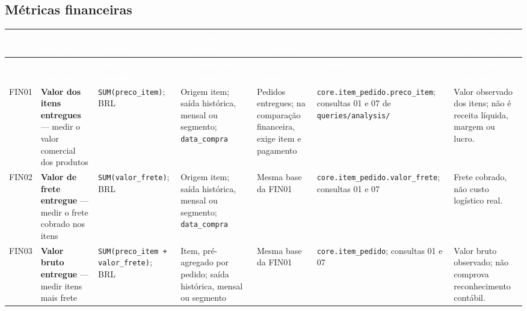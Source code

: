 \documentclass[12pt,a4paper]{article}
\newcounter{none}
\newcommand{\CabecalhoTabela}[1]{\textcolor{white}{\textbf{#1}}}
\begin{document}
\begin{landscape}
\subsection{Métricas
financeiras}\label{docs__analytics__catalogo_metricas_analiticas.md__muxe9tricas-financeiras}
{\def\LTcaptype{none}
\setlength{\tabcolsep}{2pt}
\scriptsize
{}
\begin{longtable}{|>{\RaggedRight\arraybackslash}p{1.1cm}|>{\RaggedRight\arraybackslash}p{4.0cm}|>{\RaggedRight\arraybackslash}p{3.7cm}|>{\RaggedRight\arraybackslash}p{3.5cm}|>{\RaggedRight\arraybackslash}p{3.4cm}|>{\RaggedRight\arraybackslash}p{4.0cm}|>{\RaggedRight\arraybackslash}p{3.8cm}|}
\hline
\rowcolor{AzulCorporativo}
\CabecalhoTabela{ID} & \CabecalhoTabela{Nome e finalidade} &
\CabecalhoTabela{Fórmula e unidade} &
\CabecalhoTabela{Granularidade e tempo} &
\CabecalhoTabela{Filtros e exclusões} &
\CabecalhoTabela{Fontes e SQL} &
\CabecalhoTabela{Interpretação e limitações} \\ \hline
\endfirsthead
\hline
\rowcolor{AzulCorporativo}
\CabecalhoTabela{ID} & \CabecalhoTabela{Nome e finalidade} &
\CabecalhoTabela{Fórmula e unidade} &
\CabecalhoTabela{Granularidade e tempo} &
\CabecalhoTabela{Filtros e exclusões} &
\CabecalhoTabela{Fontes e SQL} &
\CabecalhoTabela{Interpretação e limitações} \\ \hline
\endhead
\hline
\endfoot
FIN01 & \textbf{Valor dos itens entregues} --- medir o valor comercial
dos produtos & \nolinkurl{SUM(preco_item)}; BRL & Origem item; saída
histórica, mensal ou segmento; \nolinkurl{data_compra} & Pedidos
entregues; na comparação financeira, exige item e pagamento &
\nolinkurl{core.item_pedido.preco_item}; consultas 01 e 07 de
\nolinkurl{queries/analysis/} & Valor observado dos itens; não é receita
líquida, margem ou lucro. \\
FIN02 & \textbf{Valor de frete entregue} --- medir o frete cobrado nos
itens & \nolinkurl{SUM(valor_frete)}; BRL & Origem item; saída
histórica, mensal ou segmento; \nolinkurl{data_compra} & Mesma base da
FIN01 & \nolinkurl{core.item_pedido.valor_frete}; consultas 01 e 07 &
Frete cobrado, não custo logístico real. \\
FIN03 & \textbf{Valor bruto entregue} --- medir itens mais frete &
\nolinkurl{SUM(preco_item + valor_frete)}; BRL & Item, pré-agregado por
pedido; saída histórica, mensal ou segmento & Mesma base da FIN01 &
\nolinkurl{core.item_pedido}; consultas 01 e 07 & Valor bruto observado;
não comprova reconhecimento contábil. \\

\end{longtable}}
\end{landscape}
\end{document}
